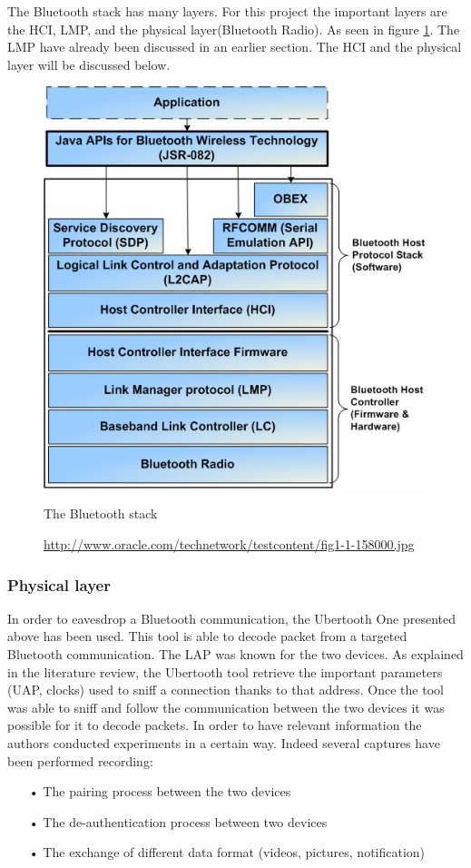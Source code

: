 The Bluetooth stack has many layers. For this project the important layers are the HCI, LMP, and the physical layer(Bluetooth Radio). As seen in figure \ref{fig:bt_stack}. The LMP have already been discussed in an earlier section. The HCI and the physical layer will be discussed below.

\begin{figure}[h]
  \includegraphics[scale=0.8]{images/bluetoothstack.jpg}
  \caption{The Bluetooth stack}
  \label{fig:bt_stack}
  \caption*{\url{http://www.oracle.com/technetwork/testcontent/fig1-1-158000.jpg}}
\end{figure}
\newpage
\subsubsection{Physical layer}
	In order to eavesdrop a Bluetooth communication, the Ubertooth One presented above has been used. This tool is able to decode packet from a targeted Bluetooth communication. \pend
	The LAP was known for the two devices. As explained in the literature review, the Ubertooth tool retrieve the important parameters (UAP, clocks) used to sniff a connection thanks to that address. Once the tool was able to sniff and follow the
	 communication between the two devices it was possible for it to decode packets.
	In order to have relevant information the authors conducted experiments in a certain way. Indeed several captures have been performed recording:
\begin{itemize}
	\item[•] The pairing process between the two devices
	\item[•] The de-authentication process between two devices
	\item[•] The exchange of different data format (videos, pictures, notification) 
\end{itemize}
		 
